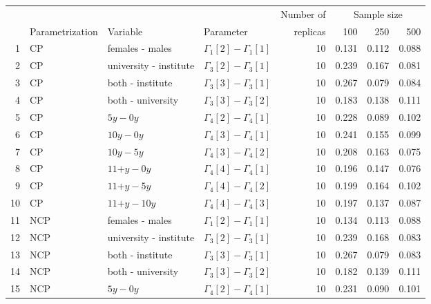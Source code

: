 %
\begin{table}[H]
	\centering
	\begin{tabular}{rlllrrrr}		
		\hline
		\multicolumn{4}{c}{ } & Number of &\multicolumn{3}{c}{ Sample size } \\ 
		\cmidrule(rl){6-8}
		& Parametrization & Variable & Parameter & replicas & 100 & 250 & 500 \\ 
		\hline\hline
		1 & CP & \footnotesize{females - males} & $\Gamma_{1}[2] - \Gamma_{1}[1]$ &   10 & 0.131 & 0.112 & 0.088 \\ 
		2 & CP & \footnotesize{university -  institute} & $\Gamma_{3}[2] - \Gamma_{3}[1]$ &   10 & 0.239 & 0.167 & 0.081 \\
		3 & CP & \footnotesize{both -  institute} & $\Gamma_{3}[3] - \Gamma_{3}[1]$ &   10 & 0.267 & 0.079 & 0.084 \\ 
		4 & CP & \footnotesize{both - university} & $\Gamma_{3}[3] - \Gamma_{3}[2]$ &   10 & 0.183 & 0.138 & 0.111 \\ 
		5 & CP & \footnotesize{$5y - 0y$} & $\Gamma_{4}[2] - \Gamma_{4}[1]$ &   10 & 0.228 & 0.089 & 0.102 \\ 
		6 & CP & \footnotesize{$10y - 0y$} & $\Gamma_{4}[3] - \Gamma_{4}[1]$ &   10 & 0.241 & 0.155 & 0.099 \\ 
		7 & CP & \footnotesize{$10y - 5y$} & $\Gamma_{4}[3] - \Gamma_{4}[2]$ &   10 & 0.208 & 0.163 & 0.075 \\ 
		8 & CP & \footnotesize{$11\text{+}y - 0y$} & $\Gamma_{4}[4] - \Gamma_{4}[1]$ &   10 & 0.196 & 0.147 & 0.076 \\ 
		9 & CP & \footnotesize{$11\text{+}y - 5y$} & $\Gamma_{4}[4] - \Gamma_{4}[2]$ &   10 & 0.199 & 0.164 & 0.102 \\ 
		10 & CP & \footnotesize{$11\text{+}y - 10y$} & $\Gamma_{4}[4] - \Gamma_{4}[3]$ &   10 & 0.197 & 0.137 & 0.087 \\ 
		\hline
		11 & NCP & \footnotesize{females - males} & $\Gamma_{1}[2] - \Gamma_{1}[1]$ &   10 & 0.134 & 0.113 & 0.088 \\ 
		12 & NCP & \footnotesize{university -  institute} & $\Gamma_{3}[2] - \Gamma_{3}[1]$ &   10 & 0.239 & 0.168 & 0.083 \\ 
		13 & NCP & \footnotesize{both -  institute} & $\Gamma_{3}[3] - \Gamma_{3}[1]$ &   10 & 0.267 & 0.079 & 0.083 \\ 
		14 & NCP & \footnotesize{both - university} & $\Gamma_{3}[3] - \Gamma_{3}[2]$ &   10 & 0.182 & 0.139 & 0.111 \\ 
		15 & NCP & \footnotesize{$5y - 0y$} & $\Gamma_{4}[2] - \Gamma_{4}[1]$ &   10 & 0.231 & 0.090 & 0.101 \\ 

\end{tabular}
\end{table}
